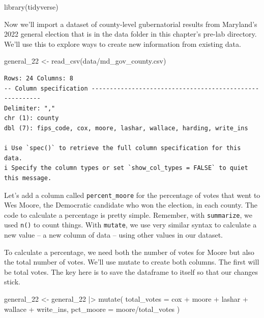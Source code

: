 \documentclass[
  letterpaper,
  DIV=11,
  numbers=noendperiod]{scrreprt}
\newenvironment{Shaded}{\begin{snugshade}}{\end{snugshade}}
\newcommand{\AttributeTok}[1]{\textcolor[rgb]{0.40,0.45,0.13}{#1}}
\newcommand{\FunctionTok}[1]{\textcolor[rgb]{0.28,0.35,0.67}{#1}}
\newcommand{\NormalTok}[1]{\textcolor[rgb]{0.00,0.23,0.31}{#1}}
\newcommand{\OtherTok}[1]{\textcolor[rgb]{0.00,0.23,0.31}{#1}}
\newcommand{\SpecialCharTok}[1]{\textcolor[rgb]{0.37,0.37,0.37}{#1}}
\newcommand{\StringTok}[1]{\textcolor[rgb]{0.13,0.47,0.30}{#1}}
\begin{document}
\begin{Shaded}
\begin{Highlighting}[]
\FunctionTok{library}\NormalTok{(tidyverse)}
\end{Highlighting}
\end{Shaded}

Now we'll import a dataset of county-level gubernatorial results from
Maryland's 2022 general election that is in the data folder in this
chapter's pre-lab directory. We'll use this to explore ways to create
new information from existing data.

\begin{Shaded}
\begin{Highlighting}[]
\NormalTok{general\_22 }\OtherTok{\textless{}{-}} \FunctionTok{read\_csv}\NormalTok{(}\StringTok{\textquotesingle{}data/md\_gov\_county.csv\textquotesingle{}}\NormalTok{)}
\end{Highlighting}
\end{Shaded}

\begin{verbatim}
Rows: 24 Columns: 8
-- Column specification --------------------------------------------------------
Delimiter: ","
chr (1): county
dbl (7): fips_code, cox, moore, lashar, wallace, harding, write_ins

i Use `spec()` to retrieve the full column specification for this data.
i Specify the column types or set `show_col_types = FALSE` to quiet this message.
\end{verbatim}

Let's add a column called \texttt{percent\_moore} for the percentage of
votes that went to Wes Moore, the Democratic candidate who won the
election, in each county. The code to calculate a percentage is pretty
simple. Remember, with \texttt{summarize}, we used \texttt{n()} to count
things. With \texttt{mutate}, we use very similar syntax to calculate a
new value -- a new column of data -- using other values in our dataset.

To calculate a percentage, we need both the number of votes for Moore
but also the total number of votes. We'll use mutate to create both
columns. The first will be total votes. The key here is to save the
dataframe to itself so that our changes stick.

\begin{Shaded}
\begin{Highlighting}[]
\NormalTok{general\_22 }\OtherTok{\textless{}{-}}\NormalTok{ general\_22 }\SpecialCharTok{|\textgreater{}}
  \FunctionTok{mutate}\NormalTok{(}
    \AttributeTok{total\_votes =}\NormalTok{ cox }\SpecialCharTok{+}\NormalTok{ moore }\SpecialCharTok{+}\NormalTok{ lashar }\SpecialCharTok{+}\NormalTok{ wallace }\SpecialCharTok{+}\NormalTok{ write\_ins,}
    \AttributeTok{pct\_moore =}\NormalTok{ moore}\SpecialCharTok{/}\NormalTok{total\_votes}
\NormalTok{  )}
\end{Highlighting}
\end{Shaded}
\end{document}
